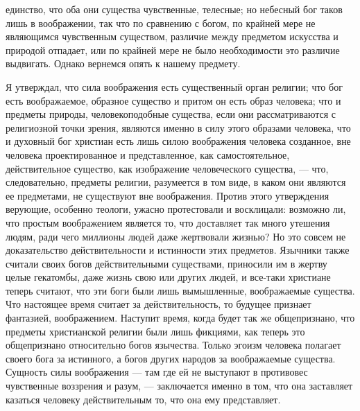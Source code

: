 \documentclass[12pt]{article}
\begin{document}
единство, что оба они существа чувственные, телесные; но небесный бог таков лишь в воображении, так что по сравнению с богом, по крайней мере не являющимся чувственным существом, различие между предметом искусства и природой отпадает, или по крайней мере не было необходимости это различие выдвигать. Однако вернемся опять к нашему предмету. 

Я утверждал, что сила воображения есть существенный орган религии; что бог есть воображаемое, образное существо и притом он есть образ человека; что и предметы природы, человекоподобные существа, если они рассматриваются с религиозной точки зрения, являются именно в силу этого образами человека, что и духовный бог христиан есть лишь силою воображения человека созданное, вне человека проектированное и представленное, как самостоятельное, действительное существо, как изображение человеческого существа, --- что, следовательно, предметы религии, разумеется в том виде, в каком они являются ее предметами, не существуют вне воображения. Против этого утверждения верующие, особенно теологи, ужасно протестовали и восклицали: возможно ли, что простым воображением является то, что доставляет так много утешения людям, ради чего миллионы людей даже жертвовали жизнью? Но это совсем не доказательство действительности и истинности этих предметов. Язычники также считали своих богов действительными существами, приносили им в жертву целые гекатомбы, даже жизнь свою или других людей, и все-таки христиане теперь считают, что эти боги были лишь вымышленные, воображаемые существа. Что настоящее время считает за действительность, то будущее признает фантазией, воображением. Наступит время, когда будет так же общепризнано, что предметы христианской религии были лишь фикциями, как теперь это общепризнано относительно богов язычества. Только эгоизм человека полагает своего бога за истинного, а богов других народов за воображаемые существа. Сущность силы воображения --- там где ей не выступают в противовес чувственные воззрения и разум, --- заключается именно в том, что она заставляет казаться человеку действительным то, что она ему представляет. 
\end{document}
